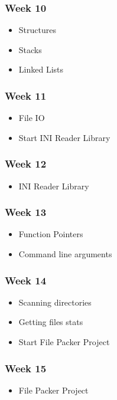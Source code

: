 \documentclass[a4paper,12pt]{report}
\begin{document}
\subsubsection*{Week 10}
\begin{itemize}
\item Structures
\item Stacks
\item Linked Lists
\end{itemize}

\subsubsection*{Week 11}
\begin{itemize}
\item File IO
\item Start INI Reader Library
\end{itemize}

\subsubsection*{Week 12}
\begin{itemize}
\item INI Reader Library
\end{itemize}

\subsubsection*{Week 13}
\begin{itemize}
\item Function Pointers
\item Command line arguments
\end{itemize}

\subsubsection*{Week 14}
\begin{itemize}
\item Scanning directories
\item Getting files stats
\item Start File Packer Project
\end{itemize}

\subsubsection*{Week 15}
\begin{itemize}
\item File Packer Project
\end{itemize}
\end{document}
